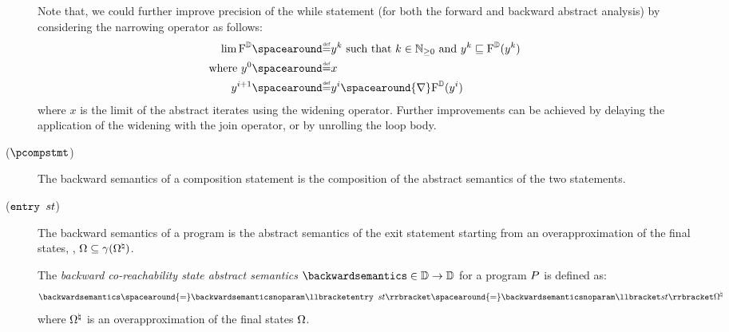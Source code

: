 \begin{description}
  Note that, we could further improve precision of the while statement (for both the forward and backward abstract analysis) by considering the narrowing operator as follows:
  \begin{align*}
    \lim \abstractdomaintransformer &\DefeQ y^k \text{ such that } k\in\Npos \text{ and } y^k \abstractdomainsubseteq \abstractdomaintransformer(y^k) \\
    \text{where } y^0 &\DefeQ x \\
    y^{i+1} &\DefeQ y^i \spacearound{\abstractdomainwidening} \abstractdomaintransformer(y^i)
  \end{align*}
  where $x$ is the limit of the abstract iterates using the widening operator.
  Further improvements can be achieved by delaying the application of the widening with the join operator, or by unrolling the loop body.
  \item[\normalfont ($\pcompstmt$)] The backward semantics of a composition statement is the composition of the abstract semantics of the two statements.
  \item[\normalfont ($\textup{\texttt{entry }} st$)]
    The backward semantics of a program is the abstract semantics of the exit statement starting from an overapproximation of the final states, \ie, $\Omega \subseteq \gamma(\Omega^\natural)$.
    \begin{definition}
      The \emph{backward co-reachability state abstract semantics} $\backwardsemantics\in\backwardtype$ for a program $P$ is defined as:
      \begin{align*}
        \backwardsemantics \spacearound{=} \backwardsemanticsnoparam \semanticsof{\progstmt} \spacearound{=} \backwardsemanticsnoparam \semanticsof{\defstmt}\abstractfinalstates
      \end{align*}
      where $\Omega^\natural$ is an overapproximation of the final states $\Omega$.
    \end{definition}
\end{description}


